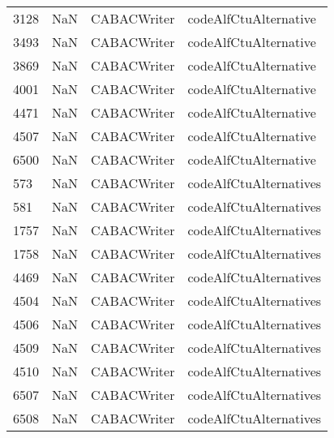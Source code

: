 \begin{tabular}{llll}
3128 &                   NaN &                CABACWriter &                     codeAlfCtuAlternative \\
3493 &                   NaN &                CABACWriter &                     codeAlfCtuAlternative \\
3869 &                   NaN &                CABACWriter &                     codeAlfCtuAlternative \\
4001 &                   NaN &                CABACWriter &                     codeAlfCtuAlternative \\
4471 &                   NaN &                CABACWriter &                     codeAlfCtuAlternative \\
4507 &                   NaN &                CABACWriter &                     codeAlfCtuAlternative \\
6500 &                   NaN &                CABACWriter &                     codeAlfCtuAlternative \\
573  &                   NaN &                CABACWriter &                    codeAlfCtuAlternatives \\
581  &                   NaN &                CABACWriter &                    codeAlfCtuAlternatives \\
1757 &                   NaN &                CABACWriter &                    codeAlfCtuAlternatives \\
1758 &                   NaN &                CABACWriter &                    codeAlfCtuAlternatives \\
4469 &                   NaN &                CABACWriter &                    codeAlfCtuAlternatives \\
4504 &                   NaN &                CABACWriter &                    codeAlfCtuAlternatives \\
4506 &                   NaN &                CABACWriter &                    codeAlfCtuAlternatives \\
4509 &                   NaN &                CABACWriter &                    codeAlfCtuAlternatives \\
4510 &                   NaN &                CABACWriter &                    codeAlfCtuAlternatives \\
6507 &                   NaN &                CABACWriter &                    codeAlfCtuAlternatives \\
6508 &                   NaN &                CABACWriter &                    codeAlfCtuAlternatives \\

\end{tabular}
